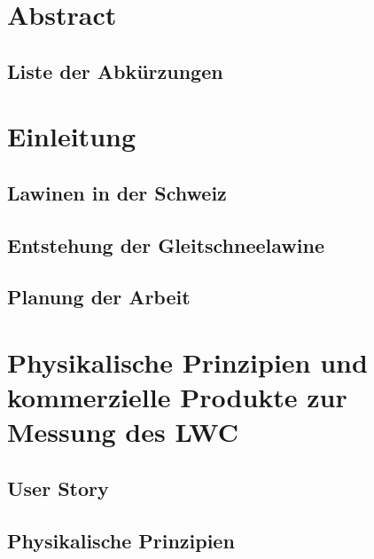 \documentclass[a4paper,12pt]{article}
\begin{document}
\begin{titlepage}
  \end{titlepage}



\pagestyle{empty}
\section*{Abstract}


\newpage
\subsection*{Liste der Abkürzungen}

\newpage
\tableofcontents
\newpage
\pagestyle{fancy}

\setcounter{page}{1}
\section{Einleitung}


\subsection{Lawinen in der Schweiz}


\subsection{Entstehung der Gleitschneelawine}


\subsection{Planung der Arbeit}


\section{Physikalische Prinzipien und kommerzielle Produkte zur Messung des LWC}


\subsection{User Story}


\subsection{Physikalische Prinzipien}

\end{document}

